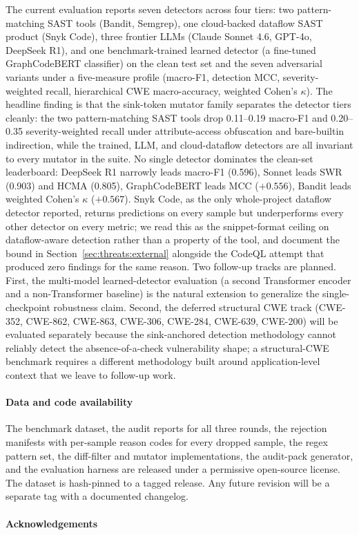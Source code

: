 The current evaluation reports seven detectors across four tiers:
two pattern-matching SAST tools (Bandit, Semgrep), one cloud-backed
dataflow SAST product (Snyk Code), three frontier LLMs (Claude
Sonnet 4.6, GPT-4o, DeepSeek R1), and one benchmark-trained learned
detector (a fine-tuned GraphCodeBERT classifier) on the clean test
set and the seven adversarial variants under a five-measure profile
(macro-F1, detection MCC, severity-weighted recall, hierarchical CWE
macro-accuracy, weighted Cohen's $\kappa$). The headline finding is
that the sink-token mutator family separates the detector tiers
cleanly: the two pattern-matching SAST tools drop 0.11--0.19 macro-F1
and 0.20--0.35 severity-weighted recall under attribute-access
obfuscation and bare-builtin indirection, while the trained, LLM,
and cloud-dataflow detectors are all invariant to every mutator in
the suite. No single detector dominates the clean-set leaderboard:
DeepSeek R1 narrowly leads macro-F1 (0.596), Sonnet leads SWR
(0.903) and HCMA (0.805), GraphCodeBERT leads MCC ($+0.556$),
Bandit leads weighted Cohen's $\kappa$ ($+0.567$). Snyk Code, as
the only whole-project dataflow detector reported, returns
predictions on every sample but underperforms every other detector
on every metric; we read this as the snippet-format ceiling on
dataflow-aware detection rather than a property of the tool, and
document the bound in Section~\ref{sec:threats:external} alongside
the CodeQL attempt that produced zero findings for the same reason.
Two follow-up tracks are planned. First, the multi-model
learned-detector evaluation (a second Transformer encoder and a
non-Transformer baseline) is the natural extension to generalize
the single-checkpoint robustness claim. Second, the deferred
structural CWE track (CWE-352, CWE-862, CWE-863, CWE-306, CWE-284,
CWE-639, CWE-200) will be evaluated separately because the
sink-anchored detection methodology cannot reliably detect the
absence-of-a-check vulnerability shape; a structural-CWE benchmark
requires a different methodology built around application-level
context that we leave to follow-up work.

\paragraph{Data and code availability}
The benchmark dataset, the audit reports for all three rounds, the
rejection manifests with per-sample reason codes for every dropped
sample, the regex pattern set, the diff-filter and mutator
implementations, the audit-pack generator, and the evaluation harness
are released under a permissive open-source license. The dataset is
hash-pinned to a tagged release. Any future revision will be a
separate tag with a documented changelog. %

\paragraph{Acknowledgements}
